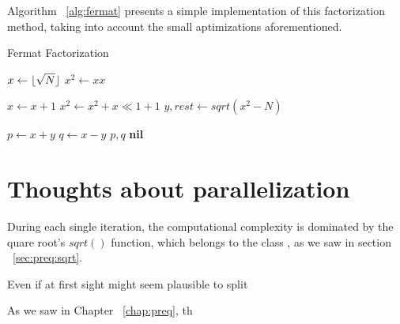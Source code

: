 Algorithm ~\ref{alg:fermat} presents a simple implementation of this
factorization method, taking into account the small aptimizations
aforementioned.

\begin{algorithm}
  \caption{Fermat Factorization \label{alg:fermat}}
  \begin{algorithmic}[1]
    \State $x \gets \lfloor\sqrt{N}\rfloor$
    \State $x^2 \gets xx$

    \Repeat
    \State $x \gets x+1$
    \State $x^2 \gets x^2 + x \ll 1 + 1$
    \State $y, rest \gets sqrt(x^2 - N)$

    \State $p \gets x+y$
    \State $q \gets x-y$
    \State \Return $p, q$
    \Else
    \State \Return \textbf{nil}
    \EndIf
    \end{algorithmic}
\end{algorithm}


\section{Thoughts about parallelization}

During each single iteration, the computational complexity is dominated by the
quare root's $sqrt()$ function, which belongs to the class
, as we saw in section ~\ref{sec:preq:sqrt}.

Even if at first sight might seem plausible to split

As we saw in Chapter ~\ref{chap:preq}, th
